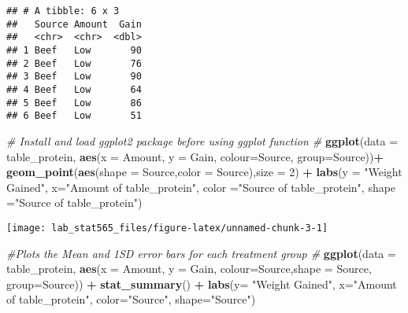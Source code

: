 \documentclass[]{article}
\newenvironment{Shaded}{\begin{snugshade}}{\end{snugshade}}
\newcommand{\CommentTok}[1]{\textcolor[rgb]{0.56,0.35,0.01}{\textit{#1}}}
\newcommand{\DataTypeTok}[1]{\textcolor[rgb]{0.13,0.29,0.53}{#1}}
\newcommand{\DecValTok}[1]{\textcolor[rgb]{0.00,0.00,0.81}{#1}}
\newcommand{\KeywordTok}[1]{\textcolor[rgb]{0.13,0.29,0.53}{\textbf{#1}}}
\newcommand{\NormalTok}[1]{#1}
\newcommand{\OperatorTok}[1]{\textcolor[rgb]{0.81,0.36,0.00}{\textbf{#1}}}
\newcommand{\StringTok}[1]{\textcolor[rgb]{0.31,0.60,0.02}{#1}}
\begin{document}
\begin{verbatim}
## # A tibble: 6 x 3
##   Source Amount  Gain
##   <chr>  <chr>  <dbl>
## 1 Beef   Low       90
## 2 Beef   Low       76
## 3 Beef   Low       90
## 4 Beef   Low       64
## 5 Beef   Low       86
## 6 Beef   Low       51
\end{verbatim}

\begin{Shaded}
\begin{Highlighting}[]
\CommentTok{# Install and load ggplot2 package before using ggplot function #}
\KeywordTok{ggplot}\NormalTok{(}\DataTypeTok{data =}\NormalTok{ table_protein, }\KeywordTok{aes}\NormalTok{(}\DataTypeTok{x =}\NormalTok{ Amount, }\DataTypeTok{y =}\NormalTok{ Gain, }\DataTypeTok{colour=}\NormalTok{Source, }\DataTypeTok{group=}\NormalTok{Source))}\OperatorTok{+}\StringTok{ }
\StringTok{  }\KeywordTok{geom_point}\NormalTok{(}\KeywordTok{aes}\NormalTok{(}\DataTypeTok{shape =}\NormalTok{ Source,}\DataTypeTok{color =}\NormalTok{ Source),}\DataTypeTok{size =} \DecValTok{2}\NormalTok{) }\OperatorTok{+}\StringTok{ }
\StringTok{  }\KeywordTok{labs}\NormalTok{(}\DataTypeTok{y =} \StringTok{"Weight Gained"}\NormalTok{, }\DataTypeTok{x=}\StringTok{"Amount of table_protein"}\NormalTok{, }\DataTypeTok{color =}\StringTok{"Source of table_protein"}\NormalTok{, }\DataTypeTok{shape =}\StringTok{"Source of table_protein"}\NormalTok{)}
\end{Highlighting}
\end{Shaded}

\texttt{[image: lab\_stat565\_files/figure-latex/unnamed-chunk-3-1]}

\begin{Shaded}
\begin{Highlighting}[]
\CommentTok{#Plots the Mean and 1SD error bars for each treatment group #}
\KeywordTok{ggplot}\NormalTok{(}\DataTypeTok{data =}\NormalTok{ table_protein, }\KeywordTok{aes}\NormalTok{(}\DataTypeTok{x =}\NormalTok{ Amount, }\DataTypeTok{y =}\NormalTok{ Gain, }\DataTypeTok{colour=}\NormalTok{Source,}\DataTypeTok{shape =}\NormalTok{ Source, }\DataTypeTok{group=}\NormalTok{Source)) }\OperatorTok{+}
\StringTok{  }\KeywordTok{stat_summary}\NormalTok{() }\OperatorTok{+}\StringTok{ }\KeywordTok{labs}\NormalTok{(}\DataTypeTok{y=} \StringTok{"Weight Gained"}\NormalTok{, }\DataTypeTok{x=}\StringTok{"Amount of table_protein"}\NormalTok{, }\DataTypeTok{color=}\StringTok{"Source"}\NormalTok{, }\DataTypeTok{shape=}\StringTok{"Source"}\NormalTok{)}
\end{Highlighting}
\end{Shaded}
\end{document}
